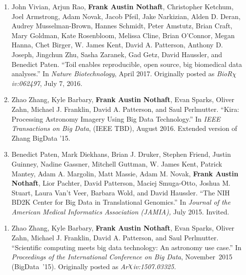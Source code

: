 \documentclass[10pt]{article} %
\newcounter{pubCtr}
\begin{document}
\begin {minipage}[t]{0.2\linewidth}
\vspace{0pt}
\end {minipage}
\begin {minipage}[t]{0.8\linewidth}
\vspace{0pt}


\setdefaultleftmargin{13pt}{}{}{}{}{}
\begin{enumerate}
\item {John Vivian, Arjun Rao, \textbf{Frank Austin Nothaft}, Christopher Ketchum,
Joel Armstrong, Adam Novak, Jacob Pfeil, Jake Narkizian, Alden D. Deran,
Audrey Musselman-Brown, Hannes Schmidt, Peter Amstutz, Brian Craft, Mary Goldman,
Kate Rosenbloom, Melissa Cline, Brian O'Connor, Megan Hanna, Chet Birger,
W. James Kent, David A. Patterson, Anthony D. Joseph, Jingchun Zhu,
Sasha Zaranek, Gad Getz, David Haussler, and Benedict Paten. ``Toil enables reproducible,
open source, big biomedical data analyses.'' In \emph{Nature
Biotechnology}, April 2017. Originally posted as \emph{BioR$\chi$iv:062497}, July 7, 2016.}
\item Zhao Zhang, Kyle Barbary, \textbf{Frank Austin Nothaft}, Evan Sparks, Oliver Zahn,
Michael J. Franklin, David A. Patterson, and Saul Perlmutter. ``Kira: Processing Astronomy
Imagery Using Big Data Technology.'' In \emph{IEEE Transactions on Big Data},
(IEEE TBD), August 2016. Extended version of Zhang BigData '15.
\item Benedict Paten, Mark Diekhans, Brian J. Druker, Stephen Friend,
Justin Guinney, Nadine Gassner, Mitchell Guttman, W. James Kent, Patrick Mantey,
Adam A. Margolin, Matt Massie, Adam M. Novak, \textbf{Frank Austin Nothaft},
Lior Pachter, David Patterson, Maciej Smuga-Otto, Joshua M. Stuart,
Laura Van’t Veer, Barbara Wold, and David Haussler. ``The NIH BD2K Center for
Big Data in Translational Genomics.'' In \emph{Journal of the American Medical
Informatics Association (JAMIA),} July 2015. Invited.
\setcounter{pubCtr}{\theenumi}
\end{enumerate}


\begin{enumerate}
\setcounter{enumi}{\thepubCtr}
\item {Zhao Zhang, Kyle Barbary, \textbf{Frank Austin Nothaft}, Evan Sparks, Oliver Zahn,
Michael J. Franklin, David A. Patterson, and Saul Perlmutter. ``Scientific computing meets big data
technology: An astronomy use case.'' In \emph{Proceedings of the International Conference on
Big Data}, November~2015 (BigData~'15). Originally posted as \emph{Ar$\raisebox{2pt}{$\chi$}$iv:1507.03325.}}
\setcounter{pubCtr}{\theenumi}
\end{enumerate}

\end{minipage}
\end{document}
